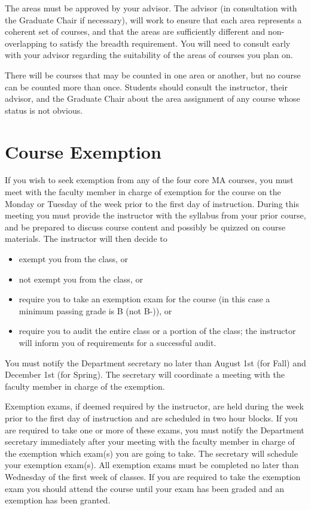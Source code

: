 \documentclass[
]{book}
\providecommand{\tightlist}{%
  \setlength{\itemsep}{0pt}\setlength{\parskip}{0pt}}
\begin{document}
The areas must be approved by your advisor. The advisor (in consultation with the Graduate Chair if necessary), will work to ensure that each area represents a coherent set of courses, and that the areas are sufficiently different and non-overlapping to satisfy the breadth requirement. You will need to consult early with your advisor regarding the suitability of the areas of courses you plan on.

There will be courses that may be counted in one area or another, but no course can be counted more than once. Students should consult the instructor, their advisor, and the Graduate Chair about the area assignment of any course whose status is not obvious.

\hypertarget{course-exemption}{%
\section{Course Exemption}\label{course-exemption}}

If you wish to seek exemption from any of the four core MA courses, you must meet with the faculty member in charge of exemption for the course on the Monday or Tuesday of the week prior to the first day of instruction. During this meeting you must provide the instructor with the syllabus from your prior course, and be prepared to discuss course content and possibly be quizzed on course materials. The instructor will then decide to

\begin{itemize}
\tightlist
\item
  exempt you from the class, or
\item
  not exempt you from the class, or
\item
  require you to take an exemption exam for the course (in this case a minimum passing grade is B (not B-)), or
\item
  require you to audit the entire class or a portion of the class; the instructor will inform you of requirements for a successful audit.
\end{itemize}

You must notify the Department secretary no later than August 1st (for Fall) and December 1st (for Spring). The secretary will coordinate a meeting with the faculty member in charge of the exemption.

Exemption exams, if deemed required by the instructor, are held during the week prior to the first day of instruction and are scheduled in two hour blocks. If you are required to take one or more of these exams, you must notify the Department secretary immediately after your meeting with the faculty member in charge of the exemption which exam(s) you are going to take. The secretary will schedule your exemption exam(s). All exemption exams must be completed no later than Wednesday of the first week of classes. If you are required to take the exemption exam you should attend the course until your exam has been graded and an exemption has been granted.
\end{document}
